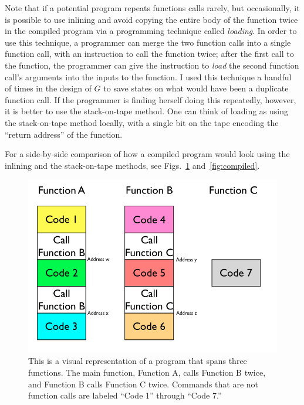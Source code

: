 \documentclass{report}
\begin{document}
Note that if a potential program repeats functions calls rarely, but occasionally, it is possible to use inlining and avoid copying the entire body of the function twice in the compiled program via a programming technique called \emph{loading}. In order to use this technique, a programmer can merge the two function calls into a single function call, with an instruction to call the function twice; after the first call to the function, the programmer can give the instruction to \emph{load} the second function call's arguments into the inputs to the function. I used this technique a handful of times in the design of $G$ to save states on what would have been a duplicate function call. If the programmer is finding herself doing this repeatedly, however, it is better to use the stack-on-tape method. One can think of loading as using the stack-on-tape method locally, with a single bit on the tape encoding the ``return address'' of the function. %

For a side-by-side comparison of how a compiled program would look using the inlining and the stack-on-tape methods, see Figs.~\ref{fig:code} and~\ref{fig:compiled}.

\begin{figure} 
\begin{center} 
\includegraphics[scale=0.6]{figs/code.png} 
\caption{This is a visual representation of a program that spans three functions. The main function, Function A, calls Function B twice, and Function B calls Function C twice. Commands that are not function calls are labeled ``Code 1'' through ``Code 7.'' \label{fig:code}} 
\end{center} 
\end{figure}
\end{document}
